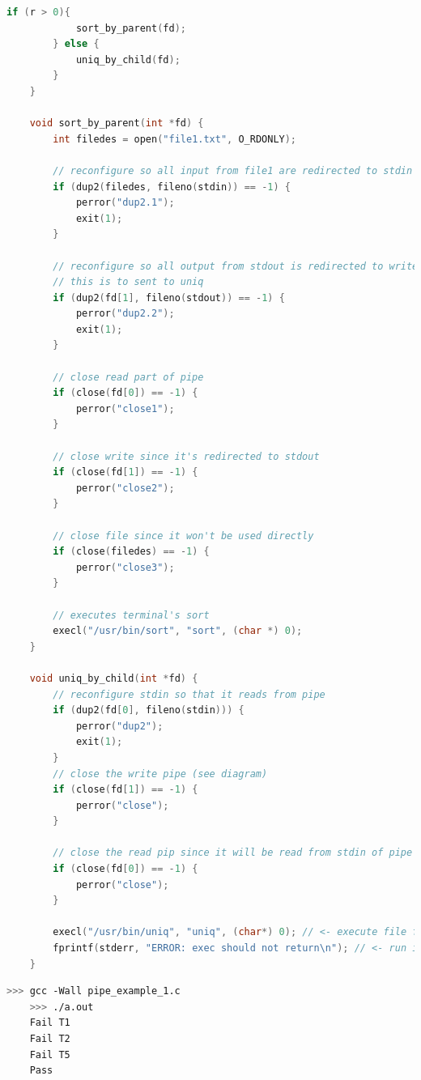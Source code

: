 \documentclass[12pt]{article}
\begin{document}
\begin{itemize}
\begin{itemize}
\begin{lstlisting}[language=c, caption={pipe\_example\_1.c}]
        if (r > 0){
            sort_by_parent(fd);
        } else {
            uniq_by_child(fd);
        }
    }

    void sort_by_parent(int *fd) {
        int filedes = open("file1.txt", O_RDONLY);

        // reconfigure so all input from file1 are redirected to stdin
        if (dup2(filedes, fileno(stdin)) == -1) {
            perror("dup2.1");
            exit(1);
        }

        // reconfigure so all output from stdout is redirected to write part of pipe
        // this is to sent to uniq
        if (dup2(fd[1], fileno(stdout)) == -1) {
            perror("dup2.2");
            exit(1);
        }

        // close read part of pipe
        if (close(fd[0]) == -1) {
            perror("close1");
        }

        // close write since it's redirected to stdout
        if (close(fd[1]) == -1) {
            perror("close2");
        }

        // close file since it won't be used directly
        if (close(filedes) == -1) {
            perror("close3");
        }

        // executes terminal's sort
        execl("/usr/bin/sort", "sort", (char *) 0);
    }

    void uniq_by_child(int *fd) {
        // reconfigure stdin so that it reads from pipe
        if (dup2(fd[0], fileno(stdin))) {
            perror("dup2");
            exit(1);
        }
        // close the write pipe (see diagram)
        if (close(fd[1]) == -1) {
            perror("close");
        }

        // close the read pip since it will be read from stdin of pipe
        if (close(fd[0]) == -1) {
            perror("close");
        }

        execl("/usr/bin/uniq", "uniq", (char*) 0); // <- execute file from file path, and return 0 if successful
        fprintf(stderr, "ERROR: exec should not return\n"); // <- run if uniq not run
    }
    \end{lstlisting}

    \begin{lstlisting}[language=bash]
    >>> gcc -Wall pipe_example_1.c
    >>> ./a.out
    Fail T1
    Fail T2
    Fail T5
    Pass
    \end{lstlisting}

    \end{itemize}
\end{itemize}
\end{document}

